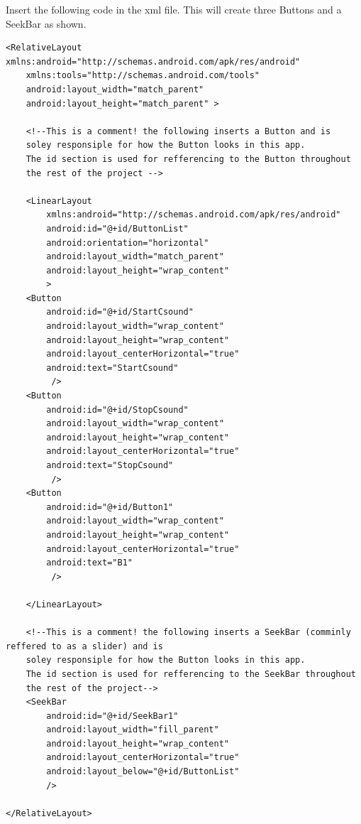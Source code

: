 \documentclass[11pt]{article}
\begin{document}
Insert the following code in the xml file. This will create three Buttons and a SeekBar as shown.
\begin{lstlisting}[caption=Code to create UI]
<RelativeLayout xmlns:android="http://schemas.android.com/apk/res/android"
    xmlns:tools="http://schemas.android.com/tools"
    android:layout_width="match_parent"
    android:layout_height="match_parent" >
    
    <!--This is a comment! the following inserts a Button and is 
    soley responsiple for how the Button looks in this app.
    The id section is used for refferencing to the Button throughout
    the rest of the project -->
    
    <LinearLayout 
        xmlns:android="http://schemas.android.com/apk/res/android"
        android:id="@+id/ButtonList"
        android:orientation="horizontal"
        android:layout_width="match_parent"
        android:layout_height="wrap_content"
        >
    <Button
        android:id="@+id/StartCsound"
        android:layout_width="wrap_content"
        android:layout_height="wrap_content"
        android:layout_centerHorizontal="true"
        android:text="StartCsound"
         />
    <Button
        android:id="@+id/StopCsound"
        android:layout_width="wrap_content"
        android:layout_height="wrap_content"
        android:layout_centerHorizontal="true"
        android:text="StopCsound"
         />
    <Button
        android:id="@+id/Button1"
        android:layout_width="wrap_content"
        android:layout_height="wrap_content"
        android:layout_centerHorizontal="true"
        android:text="B1"
         />
    
    </LinearLayout>
    
    <!--This is a comment! the following inserts a SeekBar (comminly reffered to as a slider) and is 
    soley responsiple for how the Button looks in this app.
    The id section is used for refferencing to the SeekBar throughout
    the rest of the project-->
    <SeekBar
        android:id="@+id/SeekBar1" 
        android:layout_width="fill_parent"
        android:layout_height="wrap_content"
        android:layout_centerHorizontal="true"
        android:layout_below="@+id/ButtonList"
        />

</RelativeLayout>
\end{lstlisting}
\end{document}
